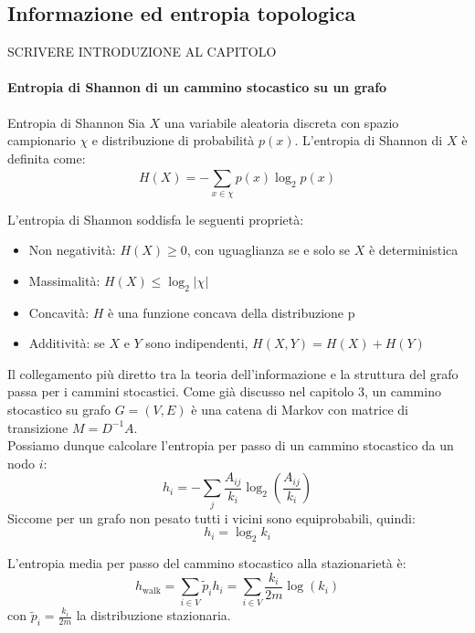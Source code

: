 \subsection{Informazione ed entropia topologica}

SCRIVERE INTRODUZIONE AL CAPITOLO

\paragraph{Entropia di Shannon di un cammino stocastico su un grafo}

\begin{boxb}{Entropia di Shannon}
Sia $X$ una variabile aleatoria discreta con spazio campionario $\chi$ e distribuzione di probabilità $p(x)$. L'entropia di Shannon di $X$ è definita come:
\begin{equation}
    H(X)=-\sum_{x \in \chi}^{}p(x) \log_2p(x)
\end{equation}
\end{boxb}
L'entropia di Shannon soddisfa le seguenti proprietà:
\begin{itemize}
    \item Non negatività: $H(X) \ge 0$, con uguaglianza se e solo se $X$ è deterministica
    \item Massimalità: $H(X) \le \log_2\left\lvert \chi\right\rvert $
    \item Concavità: $H$ è una funzione concava della distribuzione p
    \item Additività: se $X$ e $Y$ sono indipendenti, $H(X,Y)=H(X)+H(Y)$
\end{itemize}

 Il collegamento più diretto tra la teoria dell'informazione e la struttura del grafo passa per i cammini stocastici.
 Come già discusso nel capitolo 3, un cammino stocastico su grafo $G=(V,E)$ è una catena di Markov con matrice di transizione $M=D^{-1}A$.\\

 Possiamo dunque calcolare l'entropia per passo di un cammino stocastico da un nodo $i$:
 \begin{equation}
    h_i=-\sum_{j}^{}\frac{A_{ij}}{k_i}\log_2\left(\frac{A_{ij}}{k_i}\right) 
 \end{equation}
Siccome per un grafo non pesato tutti i vicini sono equiprobabili, quindi:
\begin{equation}
    h_i=\log_2k_i
\end{equation}

L'entropia media per passo del cammino stocastico alla stazionarietà è:
\begin{equation}
    h_{\text{walk}}=\sum_{i \in V}^{} \tilde{p}_ih_i=\sum_{i \in V}^{}\frac{k_i}{2m}\log(k_i)
\end{equation}
con $\tilde{p}_i=\frac{k_i}{2m}$ la distribuzione stazionaria.\\

